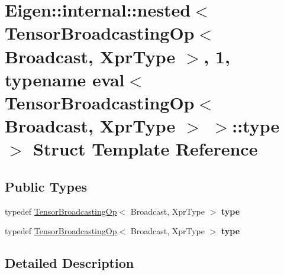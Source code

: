 \hypertarget{struct_eigen_1_1internal_1_1nested_3_01_tensor_broadcasting_op_3_01_broadcast_00_01_xpr_type_01_a47ea903448f98ead504205e509645e7}{}\section{Eigen\+:\+:internal\+:\+:nested$<$ Tensor\+Broadcasting\+Op$<$ Broadcast, Xpr\+Type $>$, 1, typename eval$<$ Tensor\+Broadcasting\+Op$<$ Broadcast, Xpr\+Type $>$ $>$\+:\+:type $>$ Struct Template Reference}
\label{struct_eigen_1_1internal_1_1nested_3_01_tensor_broadcasting_op_3_01_broadcast_00_01_xpr_type_01_a47ea903448f98ead504205e509645e7}
\subsection*{Public Types}
\begin{DoxyCompactItemize}
\item 
\mbox{\label{struct_eigen_1_1internal_1_1nested_3_01_tensor_broadcasting_op_3_01_broadcast_00_01_xpr_type_01_a47ea903448f98ead504205e509645e7_a08e16016a5660474ba25681775096d54}} 
typedef \hyperlink{class_eigen_1_1_tensor_broadcasting_op}{Tensor\+Broadcasting\+Op}$<$ Broadcast, Xpr\+Type $>$ {\bfseries type}
\item 
\mbox{\label{struct_eigen_1_1internal_1_1nested_3_01_tensor_broadcasting_op_3_01_broadcast_00_01_xpr_type_01_a47ea903448f98ead504205e509645e7_a08e16016a5660474ba25681775096d54}} 
typedef \hyperlink{class_eigen_1_1_tensor_broadcasting_op}{Tensor\+Broadcasting\+Op}$<$ Broadcast, Xpr\+Type $>$ {\bfseries type}
\end{DoxyCompactItemize}


\subsection{Detailed Description}
